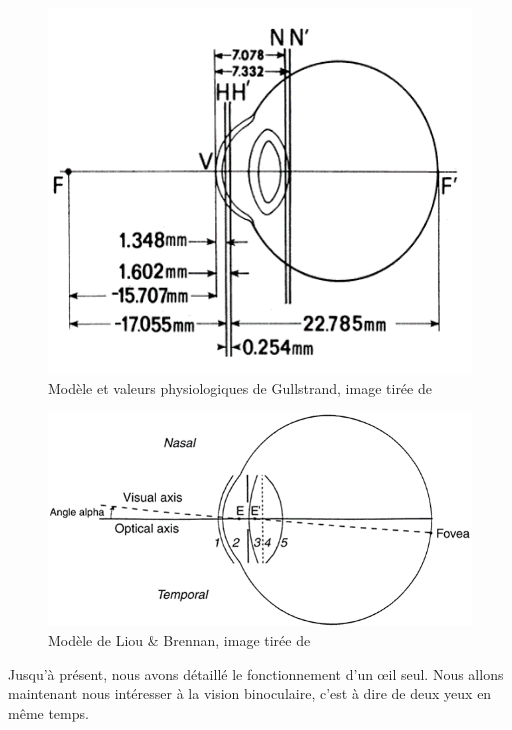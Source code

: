 	\begin{figure}
		\centering
		\includegraphics[scale=1.25]{Figures/GullstrandModel}
		\caption{Modèle et valeurs physiologiques de Gullstrand, image tirée de \citep{liou_anatomically_1997}}
		\label{fig:modele_gullstrand}
	\end{figure}
	
	\begin{figure}
		\centering
		\includegraphics[scale=1]{Figures/LiouBrennanModel}
		\caption{Modèle de Liou \& Brennan, image tirée de \citep{liou_anatomically_1997}}
		\label{fig:modele_liou_brennan}
	\end{figure}
	
	\par Jusqu'à présent, nous avons détaillé le fonctionnement d'un œil seul. Nous allons maintenant nous intéresser à la vision binoculaire, c'est à dire de deux yeux en même temps.
	
